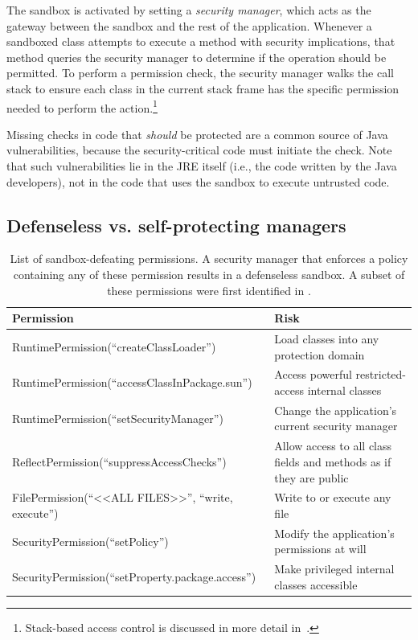\documentclass{sig-alternate}
\begin{document}
The sandbox is activated by setting a \emph{security manager}, which acts as the
gateway between the sandbox and the rest of the application. Whenever a
sandboxed class attempts to execute a method with security implications, that
method queries the security manager to determine if the operation should be
permitted. 
To perform a permission check, the security manager walks the call stack to
ensure each class in the current stack frame has the specific permission needed to
perform the action.\footnote{Stack-based access control is discussed in more
  detail
  in~\cite{banerjee_stack-based_2005,besson_stack_2004,d._s._wallach_understanding_1998,erlingsson_irm_2000,fournet_stack_2002,pistoia_beyond_2007,zhao_type_2005}.}

Missing checks in code that \emph{should} be protected are a common
source of Java vulnerabilities, because the security-critical code must initiate
the check.  Note that such vulnerabilities lie in the JRE itself (i.e., the code
written by the Java developers), not in the code that uses the sandbox to
execute untrusted code.

\subsection{Defenseless vs. self-protecting managers}
\label{sec:secmanagers}

\begin{table}
\caption{List of sandbox-defeating permissions. A security manager that enforces
a policy containing any of these permission results
\label{tab:defenseless-permissions}
in a defenseless sandbox. A subset of these permissions were first identified in \cite{security_explorations_2012}. 
}
\begin{tabular}{ll}
\toprule 
\textbf{Permission} & \textbf{Risk}\tabularnewline
\midrule
RuntimePermission(``createClassLoader'') & Load classes into any protection domain\tabularnewline
RuntimePermission(``accessClassInPackage.sun'') & Access powerful restricted-access internal classes\tabularnewline
RuntimePermission(``setSecurityManager'') & Change the application's current security manager\tabularnewline
ReflectPermission(``suppressAccessChecks'') & Allow access to all class fields and methods as if they are public\tabularnewline
FilePermission(``<\textcompwordmark{}<ALL FILES>\textcompwordmark{}>'',
``write, execute'') & Write to or execute any file\tabularnewline
SecurityPermission(``setPolicy'') & Modify the application's permissions at will\tabularnewline
SecurityPermission(``setProperty.package.access'') & Make privileged internal classes accessible\tabularnewline
\bottomrule
\end{tabular}
\vspace{-0.5cm}
\end{table}
\end{document}

